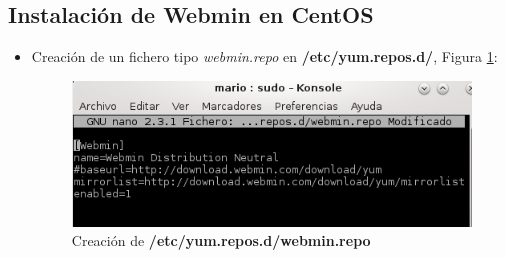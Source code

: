 \subsection{Instalación de Webmin en CentOS} \cite{enlace25}

\begin{itemize}
	\item Creación de un fichero tipo \textit{webmin.repo} en \textbf{/etc/yum.repos.d/}, Figura \ref{fig:figura39}:
	\begin{figure}[H] %
		\centering
		\includegraphics[scale=0.7]{figuras/figura39.png} 
		\caption{Creación de \textbf{/etc/yum.repos.d/webmin.repo}} 
		\label{fig:figura39}
	\end{figure}
	

\end{itemize}
